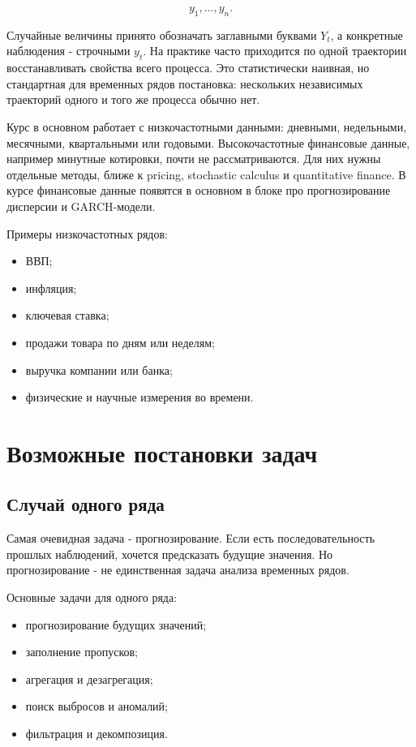 \documentclass[12pt,fleqn]{article}
\begin{document}
\[
y_1,\ldots,y_n.
\]

Случайные величины принято обозначать заглавными буквами \(Y_t\), а конкретные наблюдения - строчными \(y_t\).
На практике часто приходится по одной траектории восстанавливать свойства всего процесса.
Это статистически наивная, но стандартная для временных рядов постановка: нескольких независимых траекторий одного и того же процесса обычно нет.

Курс в основном работает с низкочастотными данными: дневными, недельными, месячными, квартальными или годовыми.
Высокочастотные финансовые данные, например минутные котировки, почти не рассматриваются.
Для них нужны отдельные методы, ближе к pricing, stochastic calculus и quantitative finance.
В курсе финансовые данные появятся в основном в блоке про прогнозирование дисперсии и GARCH-модели.

Примеры низкочастотных рядов:

\begin{itemize}
  \item ВВП;
  \item инфляция;
  \item ключевая ставка;
  \item продажи товара по дням или неделям;
  \item выручка компании или банка;
  \item физические и научные измерения во времени.
\end{itemize}


\section{Возможные постановки задач}

\subsection{Случай одного ряда}


Самая очевидная задача - прогнозирование.
Если есть последовательность прошлых наблюдений, хочется предсказать будущие значения.
Но прогнозирование - не единственная задача анализа временных рядов.

Основные задачи для одного ряда:

\begin{itemize}
  \item прогнозирование будущих значений;
  \item заполнение пропусков;
  \item агрегация и дезагрегация;
  \item поиск выбросов и аномалий;
  \item фильтрация и декомпозиция.
\end{itemize}
\end{document}
